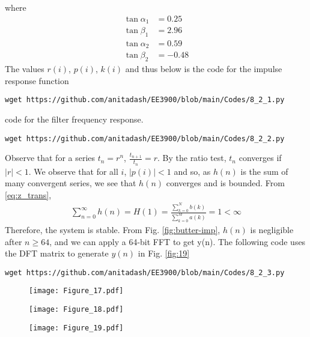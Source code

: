 \documentclass[journal,12pt,twocolumn]{IEEEtran}
\renewcommand\thesection{\arabic{section}}
\begin{document}
\begin{enumerate}[label=\thesection.\arabic*]
where
\begin{align}
	\tan{\alpha_1} &= 0.25 \\
	\tan{\beta_1} &= 2.96 \\
	\tan{\alpha_2} &= 0.59 \\
	\tan{\beta_2} &= -0.48
	\label{eq:h-params}
\end{align}
The values $r(i)$, $p(i)$, $k(i)$ and thus below is the code for the impulse response function 
\begin{lstlisting}
wget https://github.com/anitadash/EE3900/blob/main/Codes/8_2_1.py
\end{lstlisting}
code for the filter frequency response.
\begin{lstlisting}
wget https://github.com/anitadash/EE3900/blob/main/Codes/8_2_2.py
\end{lstlisting}
Observe that for a series $t_n = r^n$, $\frac{t_{n + 1}}{t_n} = r$.
By the ratio test, $t_n$ converges if $|r| < 1$. We observe that for all $i$, 
$|p(i)| < 1$ and so, as $h(n)$ is the sum of many convergent series,
we see that $h(n)$ converges and is bounded. From \eqref{eq:z_trans},
\begin{align}
	\sum_{n = 0}^{\infty}h(n) = H(1) = \frac{\sum_{k = 0}^{N}b(k)}{\sum_{k = 0}^{M}a(k)} = 1 < \infty
\end{align}
Therefore, the system is stable. From
Fig. \eqref{fig:butter-imp}, $h(n)$ is negligible after $n \geq 64$, and we
can apply a 64-bit FFT to get y(n). The following code uses the DFT matrix
to generate $y(n)$ in Fig. \eqref{fig:19}
\begin{lstlisting}
wget https://github.com/anitadash/EE3900/blob/main/Codes/8_2_3.py
\end{lstlisting}
\begin{figure}[!ht]
\begin{center}
\texttt{[image: Figure\_17.pdf]}
\end{center}
\label{fig:17}	
\end{figure}
\begin{figure}[!ht]
\begin{center}
\texttt{[image: Figure\_18.pdf]}
\end{center}
\label{fig:18}	
\end{figure}
\begin{figure}[!ht]
\begin{center}
\texttt{[image: Figure\_19.pdf]}
\end{center}

\end{figure}
\end{enumerate}
\end{document}

